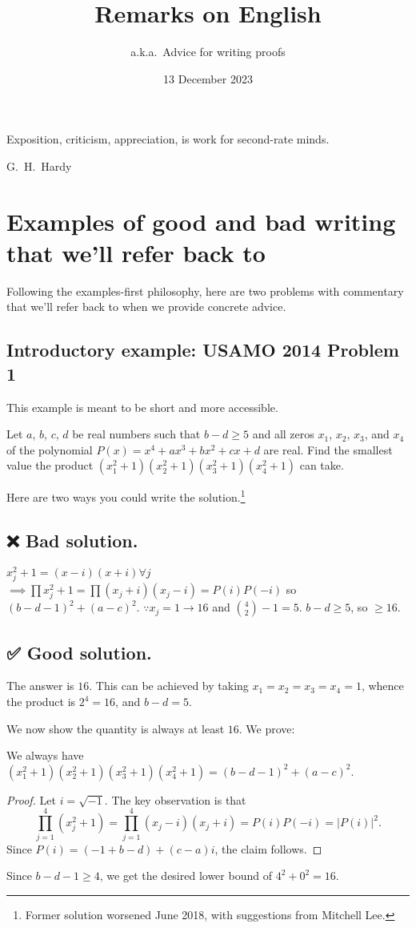 \documentclass[11pt]{scrartcl}
\begin{document}
\title{Remarks on English}
\subtitle{a.k.a.\ Advice for writing proofs}
\date{13 December 2023}
\maketitle

\epigraph{Exposition, criticism, appreciation, is work for second-rate minds.}
{G.\ H.\ Hardy}

\tableofcontents

\section{Examples of good and bad writing that we'll refer back to}
Following the examples-first philosophy, here are two problems with commentary
that we'll refer back to when we provide concrete advice.

\subsection{Introductory example: USAMO 2014 Problem 1}
This example is meant to be short and more accessible.
\begin{example}
  [USAMO 2014/1]
  Let $a$, $b$, $c$, $d$ be real numbers such that $b-d \ge 5$ and all zeros
  $x_1$, $x_2$, $x_3$, and $x_4$ of the polynomial $P(x)=x^4+ax^3+bx^2+cx+d$ are real.
  Find the smallest value the product $(x_1^2+1)(x_2^2+1)(x_3^2+1)(x_4^2+1)$ can take.
\end{example}

Here are two ways you could write the solution.\footnote{Former
solution worsened June 2018, with suggestions from Mitchell Lee.}

\subsection*{❌ Bad solution.}
$x_j^2+1 = (x-i)(x+i) \forall j$
$\implies \prod x_j^2+1 = \prod (x_j+i)(x_j-i) = P(i)P(-i)$
so $(b-d-1)^2 + (a-c)^2$.
$\because x_j = 1 \rightarrow 16$ and $\binom42-1 = 5$.
$b-d \ge 5$, so $\ge 16$.

\subsection*{✅ Good solution.}
The answer is $\boxed{16}$.
This can be achieved by taking $x_1 = x_2 = x_3 = x_4 = 1$,
whence the product is $2^4 = 16$, and $b-d = 5$.

We now show the quantity is always at least $16$.
We prove:
\begin{claim*}
  We always have $(x_1^2+1)(x_2^2+1)(x_3^2+1)(x_4^2+1) = (b-d-1)^2 + (a-c)^2$.
\end{claim*}
\begin{proof}
  Let $i = \sqrt{-1}$.
  The key observation is that
  \[ \prod_{j=1}^4 \left( x_j^2 + 1 \right)
    = \prod_{j=1}^4 (x_j - i)(x_j + i)
    = P(i)P(-i) = |P(i)|^2. \]
  Since $P(i) = (-1+b-d) + (c-a)i$, the claim follows.
\end{proof}
Since $b-d-1 \ge 4$, we get the desired lower bound of $4^2+0^2=16$.
\end{document}
